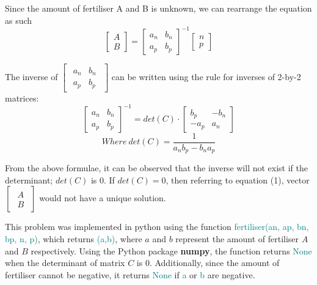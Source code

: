 \documentclass[a4paper]{article}
\newcommand \fertiliser {\textcolor{teal}{fertiliser(an, ap, bn, bp, n, p)}}
\begin{document}
\noindent
Since the amount of fertiliser A and B is unknown, we can rearrange the equation as such
\begin{equation}
    \begin{bmatrix} A \\ B \end{bmatrix} =
    \begin{bmatrix} a_n & b_n \\ a_p & b_p \end{bmatrix}^{-1}
    \begin{bmatrix} n \\p \end{bmatrix}
\end{equation}


\noindent
The inverse of $\begin{bmatrix}\begin{smallmatrix}a_n & b_n \\ a_p & b_p  \end{smallmatrix}\end{bmatrix}$ can be written using the rule for inverses of 2-by-2 matrices:
\begin{equation*}
    \begin{bmatrix} a_n & b_n \\ a_p & b_p \end{bmatrix}^{-1} =
    det(C)\cdot \begin{bmatrix} b_p & -b_n \\ -a_p & a_n \end{bmatrix}
\end{equation*}
\begin{equation*}
    Where \ det(C) = \frac{1}{a_n b_p - b_n a_p} 
\end{equation*}

\noindent
From the above formulae, it can be observed that the inverse will not exist if the determinant; $det(C)$ is $0$. If $det(C)=0$, then referring to equation (1), vector $\begin{bmatrix}\begin{smallmatrix} A \\ B \end{smallmatrix}\end{bmatrix}$ would not have a unique solution. 
\vspace{2mm}

\noindent
This problem was implemented in python using the function \fertiliser, which returns \textcolor{teal}{(a,b)}, where $a$ and $b$ represent the amount of fertiliser $A$ and $B$ respectively. Using the Python package \textbf{numpy}, the function returns \textcolor{teal}{None} when the determinant of matrix $C$ is $0$. Additionally, since the amount of fertiliser cannot be negative, it returns \textcolor{teal}{None} if \textcolor{teal}{a} or \textcolor{teal}{b} are negative.
\vspace{40mm}

\nocite{CAB203_22se1}
\printbibliography
\end{document}
